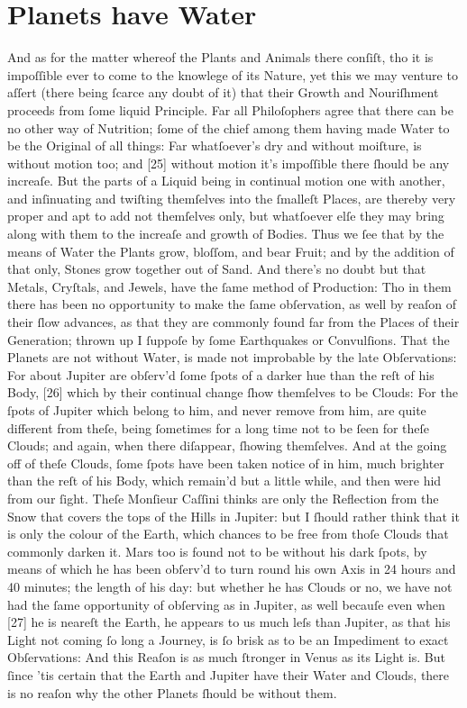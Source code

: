 \documentclass[letterpaper]{book}
\begin{document}
\section{Planets have Water}

And as for the matter whereof the Plants and Animals there conſiſt, tho it
is impoſſible ever to come to the knowlege of its Nature, yet this we may
venture to aſſert (there being ſcarce any doubt of it) that their Growth and
Nouriſhment proceeds from ſome liquid Principle. Far all Philoſophers agree
that there can be no other way of Nutrition; ſome of the chief among them
having made Water to be the Original of all things: Far whatſoever's dry and
without moiſture, is without motion too; and [25] without motion it's
impoſſible there ſhould be any increaſe. But the parts of a Liquid being in
continual motion one with another, and inſinuating and twiſting themſelves
into the ſmalleſt Places, are thereby very proper and apt to add not
themſelves only, but whatſoever elſe they may bring along with them to the
increaſe and growth of Bodies. Thus we ſee that by the means of Water the
Plants grow, bloſſom, and bear Fruit; and by the addition of that only,
Stones grow together out of Sand. And there's no doubt but that Metals,
Cryſtals, and Jewels, have the ſame method of Production: Tho in them there
has been no opportunity to make the ſame obſervation, as well by reaſon of
their ſlow advances, as that they are commonly found far from the Places of
their Generation; thrown up I ſuppoſe by ſome Earthquakes or Convulſions.
That the Planets are not without Water, is made not improbable by the late
Obſervations: For about Jupiter are obſerv'd ſome ſpots of a darker hue than
the reſt of his Body, [26] which by their continual change ſhow themſelves
to be Clouds: For the ſpots of Jupiter which belong to him, and never remove
from him, are quite different from theſe, being ſometimes for a long time
not to be ſeen for theſe Clouds; and again, when there diſappear, ſhowing
themſelves. And at the going off of theſe Clouds, ſome ſpots have been taken
notice of in him, much brighter than the reſt of his Body, which remain'd
but a little while, and then were hid from our ſight. Theſe Monſieur Caſſini
thinks are only the Reflection from the Snow that covers the tops of the
Hills in Jupiter: but I ſhould rather think that it is only the colour of
the Earth, which chances to be free from thoſe Clouds that commonly darken
it.  Mars too is found not to be without his dark ſpots, by means of which
he has been obſerv'd to turn round his own Axis in 24 hours and 40 minutes;
the length of his day: but whether he has Clouds or no, we have not had the
ſame opportunity of obſerving as in Jupiter, as well becauſe even when [27]
he is neareſt the Earth, he appears to us much leſs than Jupiter, as that
his Light not coming ſo long a Journey, is ſo brisk as to be an Impediment
to exact Obſervations: And this Reaſon is as much ſtronger in Venus as its
Light is. But ſince 'tis certain that the Earth and Jupiter have their Water
and Clouds, there is no reaſon why the other Planets ſhould be without them.
\end{document}
